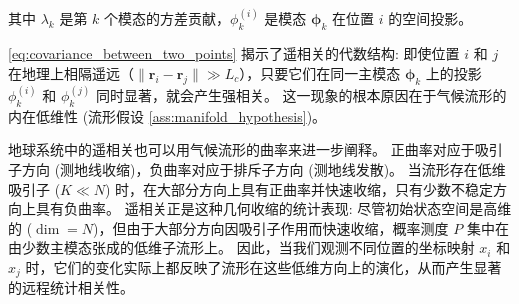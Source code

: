 \documentclass[12pt, a4paper]{article}
\newcommand{\measure}{P}
\newcommand{\eigenval}{\lambda}         %
\newcommand{\mode}{\bm{\phi}}           %
\begin{document}
其中 $\eigenval_k$ 是第 $k$ 个模态的方差贡献，$\phi_k^{(i)}$ 是模态 $\mode_k$ 在位置 $i$ 的空间投影。

\eqref{eq:covariance_between_two_points} 揭示了遥相关的代数结构: 即使位置 $i$ 和 $j$ 在地理上相隔遥远（$\|\bm{r}_i - \bm{r}_j\| \gg L_c$），只要它们在同一主模态 $\mode_k$ 上的投影 $\phi_k^{(i)}$ 和 $\phi_k^{(j)}$ 同时显著，就会产生强相关。
这一现象的根本原因在于气候流形的内在低维性 (流形假设 \ref{ass:manifold_hypothesis})。

地球系统中的遥相关也可以用气候流形的曲率来进一步阐释。
正曲率对应于吸引子方向 (测地线收缩)，负曲率对应于排斥子方向 (测地线发散)。
当流形存在低维吸引子 ($K \ll N$) 时，在大部分方向上具有正曲率并快速收缩，只有少数不稳定方向上具有负曲率。
遥相关正是这种几何收缩的统计表现: 尽管初始状态空间是高维的 ($\dim = N$)，但由于大部分方向因吸引子作用而快速收缩，概率测度 $\measure$ 集中在由少数主模态张成的低维子流形上。
因此，当我们观测不同位置的坐标映射 $x_i$ 和 $x_j$ 时，它们的变化实际上都反映了流形在这些低维方向上的演化，从而产生显著的远程统计相关性。



\newpage


\end{document}
